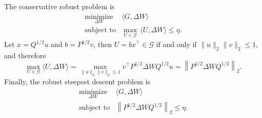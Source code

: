 \documentclass[11pt]{article}
\theoremstyle{plain}
\theoremstyle{definition}
\theoremstyle{remark}
\begin{document}
The conservative robust problem is
\[
\begin{array}{ll}
    \underset{\Delta W}{\operatorname{minimize}}
        & \langle G,\Delta W\rangle \\
    \operatorname{subject\ to}
        & \displaystyle
          \max_{U\in\mathcal G} \,
          \langle U,\Delta W\rangle
          \leq\eta .
\end{array}
\]
Let $x=Q^{1/2}u$ and
$b=P^{1/2}v$,
then $U=bx^\top\in\mathcal G$ if and only if
$\|u\|_2\|v\|_2\leq1$, and therefore
\[
    \max_{U\in\mathcal G}\langle U,\Delta W\rangle
    =
    \max_{\|u\|_2\|v\|_2\leq1}
    v^\top P^{1/2}\Delta WQ^{1/2}u 
    =
    \left\|P^{1/2}\Delta WQ^{1/2}\right\|_2.
\]
Finally, the robust steepest descent problem is
\[
\begin{array}{ll}
    \underset{\Delta W}{\operatorname{minimize}}
        & \langle G,\Delta W\rangle \\
    \operatorname{subject\ to}
        &
        \left\|P^{1/2}\Delta WQ^{1/2}\right\|_2
        \leq\eta .
\end{array}
\]
\end{document}
